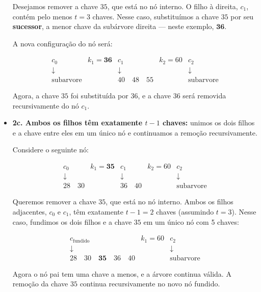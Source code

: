 \begin{itemize}
Desejamos remover a chave \( 35 \), que está no nó interno. O filho à direita, \( c_1 \), contém pelo menos \( t = 3 \) chaves. 
Nesse caso, substituímos a chave \( 35 \) por seu \textbf{sucessor}, a menor chave da subárvore direita — neste exemplo, \( \mathbf{36} \).

A nova configuração do nó será:

\[
\begin{array}{ccccccc}
  \boxed{c_0}      &  k_1 = \mathbf{36} & \boxed{c_1}         & k_2 = 60 & \boxed{c_2} \\
  \downarrow       &           & \downarrow          &          & \downarrow  \\
  \text{subarvore} &       & \boxed{40 \quad 48 \quad 55} &        & \text{subarvore}
\end{array}
\]

Agora, a chave \( 35 \) foi substituída por \( 36 \), e a chave \( 36 \) será removida recursivamente do nó \( c_1 \).


  \item \textbf{2c. Ambos os filhos têm exatamente \( t - 1 \) chaves:} unimos os dois filhos e a chave entre eles em um único nó e continuamos a remoção recursivamente.

Considere o seguinte nó:

\[
\begin{array}{ccccccc}
  \boxed{c_0}      &  k_1 = \mathbf{35} & \boxed{c_1}        & k_2 = 60 & \boxed{c_2} \\
  \downarrow       &           & \downarrow         &          & \downarrow  \\
  \boxed{28 \quad 30} &         & \boxed{36 \quad 40} &        & \text{subarvore}
\end{array}
\]

Queremos remover a chave \( 35 \), que está no nó interno. 
Ambos os filhos adjacentes, \( c_0 \) e \( c_1 \), têm exatamente \( t - 1 = 2 \) chaves (assumindo \( t = 3 \)). 
Nesse caso, fundimos os dois filhos e a chave \( 35 \) em um único nó com 5 chaves:

\[
\begin{array}{ccccc}
  \boxed{c_{\text{fundido}}} & k_1 = 60 & \boxed{c_2} \\
  \downarrow & & \downarrow \\
  \boxed{28 \quad 30 \quad \mathbf{35} \quad 36 \quad 40} & & \text{subarvore}
\end{array}
\]

Agora o nó pai tem uma chave a menos, e a árvore continua válida. 
A remoção da chave \( 35 \) continua recursivamente no novo nó fundido.

\end{itemize}

